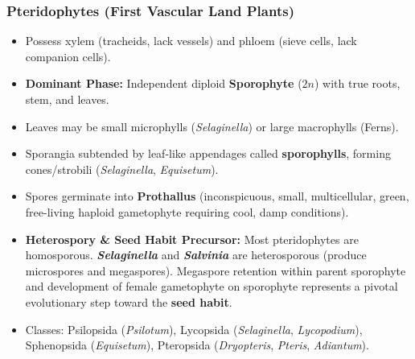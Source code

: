 \documentclass[11pt,a4paper]{article}
\begin{document}
\subsubsection{Pteridophytes (First Vascular Land Plants)}
\begin{itemize}[leftmargin=1.5em, itemsep=2pt]
  \item Possess xylem (tracheids, lack vessels) and phloem (sieve cells, lack companion cells).
  \item \textbf{Dominant Phase:} Independent diploid \textbf{Sporophyte} ($2n$) with true roots, stem, and leaves.
  \item Leaves may be small microphylls (\textit{Selaginella}) or large macrophylls (Ferns).
  \item Sporangia subtended by leaf-like appendages called \textbf{sporophylls}, forming cones/strobili (\textit{Selaginella}, \textit{Equisetum}).
  \item Spores germinate into \textbf{Prothallus} (inconspicuous, small, multicellular, green, free-living haploid gametophyte requiring cool, damp conditions).
  \item \textbf{Heterospory \& Seed Habit Precursor:} Most pteridophytes are homosporous. \textbf{\textit{Selaginella}} and \textbf{\textit{Salvinia}} are heterosporous (produce microspores and megaspores). Megaspore retention within parent sporophyte and development of female gametophyte on sporophyte represents a pivotal evolutionary step toward the \textbf{seed habit}.
  \item Classes: Psilopsida (\textit{Psilotum}), Lycopsida (\textit{Selaginella}, \textit{Lycopodium}), Sphenopsida (\textit{Equisetum}), Pteropsida (\textit{Dryopteris}, \textit{Pteris}, \textit{Adiantum}).
\end{itemize}
\end{document}
